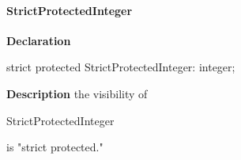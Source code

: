 \documentclass{report}
\begin{document}
\paragraph*{StrictProtectedInteger}\hspace*{\fill}

\begin{list}{}{
\setlength{\itemindent}{0cm}
\setlength{\listparindent}{0cm}
\setlength{\leftmargin}{\evensidemargin}
\addtolength{\leftmargin}{\tmplength}
\settowidth{\labelsep}{X}
\addtolength{\leftmargin}{\labelsep}
\setlength{\labelwidth}{\tmplength}
}
\begin{flushleft}
\item[\textbf{Declaration}\hfill]
\begin{ttfamily}
strict protected StrictProtectedInteger: integer;\end{ttfamily}


\end{flushleft}
\par
\item[\textbf{Description}]
the visibility of \begin{ttfamily}StrictProtectedInteger\end{ttfamily} is "strict protected."

\end{list}
\end{document}
